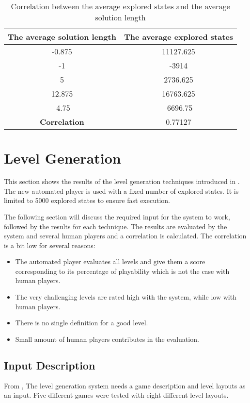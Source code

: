 \begin{table}[!ht]
	\centering
	\begin{tabular}{|c|c|}
		\hline
		\textbf{The average solution length} & \textbf{The average explored states}\\
		\hline
		-0.875 & 11127.625\\
		\hline
		-1 & -3914\\
		\hline
		5 & 2736.625\\
		\hline
		12.875 & 16763.625\\
		\hline
		-4.75 & -6696.75\\
		\hline
		\textbf{Correlation} & 0.77127\\
		\hline
	\end{tabular}
	\caption{Correlation between the average explored states and the average solution length}
	\label{Table:playerCorrelation}
\end{table}

\section{Level Generation}
This section shows the results of the level generation techniques introduced in . The new automated player is used with a fixed number of explored states. It is limited to 5000 explored states to ensure fast execution.\\\par

The following section will discuss the required input for the system to work, followed by the results for each technique. The results are evaluated by the system and several human players and a correlation is calculated. The correlation is a bit low for several reasons:
\begin{itemize} \itemsep0pt \parskip0pt 
	\item The automated player evaluates all levels and give them a score corresponding to its percentage of playability which is not the case with human players. 
	\item The very challenging levels are rated high with the system, while low with human players.
	\item There is no single definition for a good level.
	\item Small amount of human players contributes in the evaluation.
\end{itemize}

\subsection{Input Description}
From , The level generation system needs a game description and level layouts as an input. Five different games were tested with eight different level layouts.

